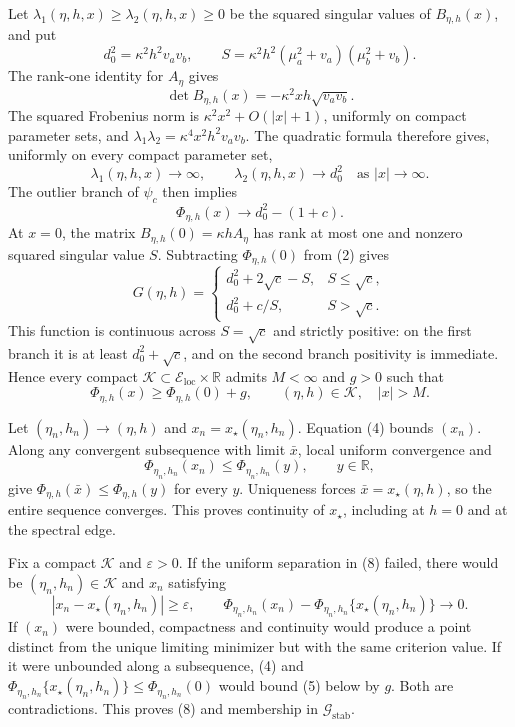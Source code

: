 Let \(\lambda_1(\eta,h,x)\geq\lambda_2(\eta,h,x)\geq0\) be the squared singular values of \(B_{\eta,h}(x)\), and put
\[
 d_0^2=\kappa^2h^2v_av_b,
 \qquad
 S=\kappa^2h^2(\mu_a^2+v_a)(\mu_b^2+v_b).
\]
The rank-one identity for \(A_\eta\) gives
\[
 \det B_{\eta,h}(x)=-\kappa^2xh\sqrt{v_av_b}.
\]
The squared Frobenius norm is \(\kappa^2x^2+O(|x|+1)\), uniformly on compact parameter sets, and
\(\lambda_1\lambda_2=\kappa^4x^2h^2v_av_b\).  The quadratic formula therefore gives, uniformly on every compact parameter set,
\[
 \lambda_1(\eta,h,x)\longrightarrow\infty,
 \qquad
 \lambda_2(\eta,h,x)\longrightarrow d_0^2
 \quad\text{as }|x|\longrightarrow\infty. \tag{1}
\]
The outlier branch of \(\psi_c\) then implies
\[
 \Phi_{\eta,h}(x)\longrightarrow d_0^2-(1+c). \tag{2}
\]
At \(x=0\), the matrix \(B_{\eta,h}(0)=\kappa hA_\eta\) has rank at most one and nonzero squared singular value \(S\).  Subtracting \(\Phi_{\eta,h}(0)\) from (2) gives
\[
 G(\eta,h)=
 \begin{cases}
 d_0^2+2\sqrt c-S,&S\leq\sqrt c,\\
 d_0^2+c/S,&S>\sqrt c.
 \end{cases} \tag{3}
\]
This function is continuous across \(S=\sqrt c\) and strictly positive: on the first branch it is at least \(d_0^2+\sqrt c\), and on the second branch positivity is immediate.  Hence every compact \(\mathcal K\subset\mathcal E_{\mathrm{loc}}\times\mathbb R\) admits \(M<\infty\) and \(g>0\) such that
\[
 \Phi_{\eta,h}(x)\geq\Phi_{\eta,h}(0)+g,
 \qquad (\eta,h)\in\mathcal K,\quad |x|>M. \tag{4}
\]

Let \((\eta_n,h_n)\to(\eta,h)\) and \(x_n=x_\star(\eta_n,h_n)\).  Equation (4) bounds \((x_n)\).  Along any convergent subsequence with limit \(\bar x\), local uniform convergence and
\[
 \Phi_{\eta_n,h_n}(x_n)\leq\Phi_{\eta_n,h_n}(y),\qquad y\in\mathbb R,
\]
give \(\Phi_{\eta,h}(\bar x)\leq\Phi_{\eta,h}(y)\) for every \(y\).  Uniqueness forces \(\bar x=x_\star(\eta,h)\), so the entire sequence converges.  This proves continuity of \(x_\star\), including at \(h=0\) and at the spectral edge.

Fix a compact \(\mathcal K\) and \(\varepsilon>0\).  If the uniform separation in (8) failed, there would be \((\eta_n,h_n)\in\mathcal K\) and \(x_n\) satisfying
\[
 |x_n-x_\star(\eta_n,h_n)|\geq\varepsilon,
 \qquad
 \Phi_{\eta_n,h_n}(x_n)-
 \Phi_{\eta_n,h_n}\{x_\star(\eta_n,h_n)\}\longrightarrow0. \tag{5}
\]
If \((x_n)\) were bounded, compactness and continuity would produce a point distinct from the unique limiting minimizer but with the same criterion value.  If it were unbounded along a subsequence, (4) and
\(\Phi_{\eta_n,h_n}\{x_\star(\eta_n,h_n)\}\leq\Phi_{\eta_n,h_n}(0)\) would bound (5) below by \(g\).  Both are contradictions.  This proves (8) and membership in \(\mathcal G_{\mathrm{stab}}\).

